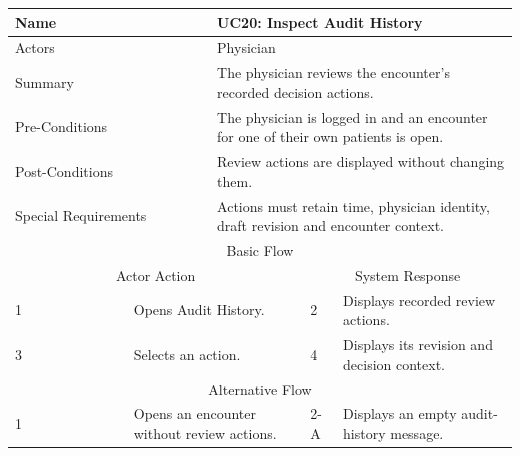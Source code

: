 \begin{reporttable}
\centering
\small
\caption{UC20: Inspect Audit History.}
\label{tab:kashaf:uc20}
\begin{tabular}{|p{}|p{}|p{}|p{}|p{}|}
\hline
\multicolumn{2}{|p{\dimexpr0.225\textwidth+2\tabcolsep+\arrayrulewidth\relax}|}{Name} & \multicolumn{3}{p{\dimexpr0.575\textwidth+4\tabcolsep+2\arrayrulewidth\relax}|}{UC20: Inspect Audit History} \\ \hline
\multicolumn{2}{|p{\dimexpr0.225\textwidth+2\tabcolsep+\arrayrulewidth\relax}|}{Actors} & \multicolumn{3}{p{\dimexpr0.575\textwidth+4\tabcolsep+2\arrayrulewidth\relax}|}{Physician} \\ \hline
\multicolumn{2}{|p{\dimexpr0.225\textwidth+2\tabcolsep+\arrayrulewidth\relax}|}{Summary} & \multicolumn{3}{p{\dimexpr0.575\textwidth+4\tabcolsep+2\arrayrulewidth\relax}|}{The physician reviews the encounter's recorded decision actions.} \\ \hline
\multicolumn{2}{|p{\dimexpr0.225\textwidth+2\tabcolsep+\arrayrulewidth\relax}|}{Pre-Conditions} & \multicolumn{3}{p{\dimexpr0.575\textwidth+4\tabcolsep+2\arrayrulewidth\relax}|}{The physician is logged in and an encounter for one of their own patients is open.} \\ \hline
\multicolumn{2}{|p{\dimexpr0.225\textwidth+2\tabcolsep+\arrayrulewidth\relax}|}{Post-Conditions} & \multicolumn{3}{p{\dimexpr0.575\textwidth+4\tabcolsep+2\arrayrulewidth\relax}|}{Review actions are displayed without changing them.} \\ \hline
\multicolumn{2}{|p{\dimexpr0.225\textwidth+2\tabcolsep+\arrayrulewidth\relax}|}{Special Requirements} & \multicolumn{3}{p{\dimexpr0.575\textwidth+4\tabcolsep+2\arrayrulewidth\relax}|}{Actions must retain time, physician identity, draft revision and encounter context.} \\ \hline
\multicolumn{5}{|c|}{Basic Flow} \\ \hline
\multicolumn{3}{|c|}{Actor Action} & \multicolumn{2}{c|}{System Response} \\ \hline
1 & \multicolumn{2}{p{\dimexpr0.37\textwidth+2\tabcolsep+\arrayrulewidth\relax}|}{Opens Audit History.} & 2 & Displays recorded review actions. \\ \hline
3 & \multicolumn{2}{p{\dimexpr0.37\textwidth+2\tabcolsep+\arrayrulewidth\relax}|}{Selects an action.} & 4 & Displays its revision and decision context. \\ \hline
\multicolumn{5}{|c|}{Alternative Flow} \\ \hline
1 & \multicolumn{2}{p{\dimexpr0.37\textwidth+2\tabcolsep+\arrayrulewidth\relax}|}{Opens an encounter without review actions.} & 2-A & Displays an empty audit-history message. \\ \hline
\end{tabular}
\end{reporttable}

